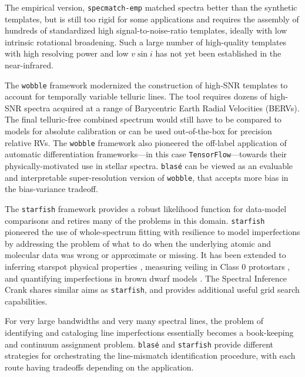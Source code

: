 \documentclass[twocolumn]{aastex631}
\begin{document}
The empirical version, \texttt{specmatch-emp} \citep{2017ApJ...836...77Y} matched spectra better than the synthetic templates, but is still too rigid for some applications and requires the assembly of hundreds of standardized high signal-to-noise-ratio templates, ideally with low intrinsic rotational broadening.  Such a large number of high-quality templates with high resolving power and low $v\sin{i}$ has not yet been established in the near-infrared.

The \texttt{wobble} framework \citep{2019AJ....158..164B} modernized the construction of high-SNR templates to account for temporally variable telluric lines. The tool requires dozens of high-SNR spectra acquired at a range of Barycentric Earth Radial Velocities (BERVs).  The final telluric-free combined spectrum would still have to be compared to models for absolute calibration or can be used out-of-the-box for precision relative RVs.  The \texttt{wobble} framework also pioneered the off-label application of automatic differentiation frameworks---in this case \texttt{TensorFlow}---towards their physically-motivated use in stellar spectra.  \texttt{blas\'e} can be viewed as an evaluable and interpretable super-resolution version of \texttt{wobble}, that accepts more bias in the bias-variance tradeoff.

The \texttt{starfish} framework \citep{czekala15} provides a robust likelihood function for data-model comparisons and retires many of the problems in this domain.  \texttt{starfish} pioneered the use of whole-spectrum fitting with resilience to model imperfections by addressing the problem of what to do when the underlying atomic and molecular data was wrong or approximate or missing.  It has been extended to inferring starspot physical properties \citep{2017ApJ...836..200G}, measuring veiling in Class 0 protostars \citep{2018ApJ...862...85G}, and quantifying imperfections in brown dwarf models \citep{2021ApJ...921...95Z}.  The Spectral Inference Crank \citep[\texttt{sick},][]{2016ApJS..223....8C} shares similar aims as \texttt{starfish}, and provides additional useful grid search capabilities.

For very large bandwidths and very many spectral lines, the problem of identifying and cataloging line imperfections essentially becomes a book-keeping and continuum assignment problem.  \texttt{blas\'e} and \texttt{starfish} provide different strategies for orchestrating the line-mismatch identification procedure, with each route having tradeoffs depending on the application.
\end{document}
